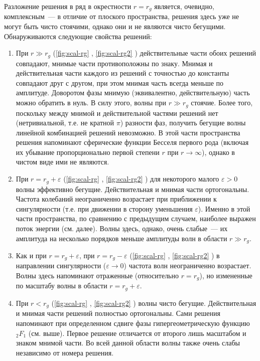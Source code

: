 \documentclass[\docroot/reports/draft/report.tex]{subfiles}
\begin{document}
        Разложение решения в ряд в окрестности $r = r_g$ является, очевидно, комплексным~--- в отличие от плоского пространства, решения здесь уже не могут быть чисто стоячими, однако они и не являются чисто бегущими. Обнаруживаются следующие свойства решений:
        \begin{enumerate}
            \item При $r \gg r_g$ (\autoref{fig:scal-rg} , \autoref{fig:scal-rg2} ) действительные части обоих решений совпадают, мнимые части противоположны по знаку. Мнимая и действительная части каждого из решений с точностью до константы совпадают друг с другом, при этом мнимая часть всегда меньше по амплитуде. Доворотом фазы мнимую (эквивалентно, действительную) часть можно обратить в нуль. В силу этого, волны при $r \gg r_g$ стоячие. Более того, поскольку между мнимой и действительной частями решений нет (нетривиальной, т.е. не кратной $\pi$) разности фаз, получить бегущие волны линейной комбинацией решений невозможно. В этой части пространства решения напоминают сферические функции Бесселя первого рода (включая их убывание пропорционально первой степени $r$ при $r \to \infty$), однако в чистом виде ими не являются.
            \item При $r = r_g + \varepsilon$ (\autoref{fig:scal-rg} , \autoref{fig:scal-rg2} ) для некоторого малого $\varepsilon > 0$ волны эффективно бегущие. Действительная и мнимая части ортогональны. Частота колебаний неограниченно возрастает при приближении к сингулярности (т.е. при движении в сторону уменьшения $\varepsilon$). Именно в этой части пространства, по сравнению с предыдущим случаем, наиболее выражен поток энергии (см. далее). Волны здесь, однако, очень слабые~--- их амплитуда на несколько порядков меньше амплитуды волн в области $r \gg r_g$.
            \item Как и при $r = r_g + \varepsilon$, при $r = r_g - \varepsilon$ (\autoref{fig:scal-rg} , \autoref{fig:scal-rg2} ) в направлении сингулярности ($\varepsilon \to 0$) частота волн неограниченно возрастает. Волны здесь напоминают отраженные (относительно $r = r_g$), но измененные по масштабу волны в области $r = r_g + \varepsilon$.
            \item При $r < r_g$  (\autoref{fig:scal-rg} , \autoref{fig:scal-rg2} ) волны чисто бегущие. Действительная и мнимая части решений полностью ортогональны. Сами решения напоминают при определенном сдвиге фазы гипергеометрическую функцию ${}_2 F_1$ (см. выше). Первое решение отличается от второго лишь масштабом и знаком мнимой части. Во всей данной области волны также очень слабы независимо от номера решения.
        \end{enumerate}
\end{document}
